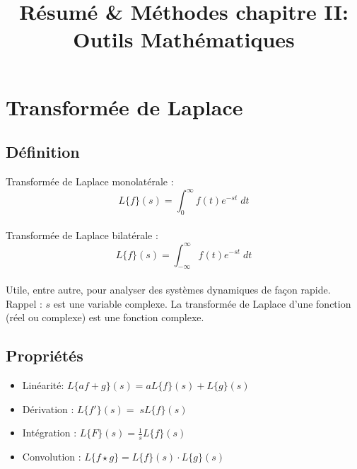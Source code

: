 \documentclass[11pt,a4paper]{article}
\begin{document}
\title{Résumé \& Méthodes chapitre II: Outils Mathématiques}
\maketitle
\section{Transformée de Laplace}
\subsection{Définition}
Transformée de Laplace monolatérale : 
	\[L\{f\}(s) = \displaystyle \int^{\infty}_{0} f(t) e^{-st} \; dt\]\\ 
	\vspace{0.3cm}
Transformée de Laplace bilatérale : \[L\{f\}(s) = \displaystyle \int^{\infty}_{-\infty} f(t) e^{-st} \; dt\]\\

Utile, entre autre, pour analyser des systèmes dynamiques de façon rapide. \\

Rappel :  $s$ est une variable complexe. La transformée de Laplace d'une fonction (réel ou complexe) est une fonction complexe.\\
\vspace{0.15cm}


\subsection{Propriétés}

\begin{itemize}
\item Linéarité:  $L\{af+g\}(s) = a L\{ f\}(s) + L \{ g \} (s)$
\vspace{0.1cm}
\item Dérivation : $ L\{f'\}(s) = \; s L\{f \}(s)$
\vspace{0.1cm}
\item Intégration : $ L\{F\}(s) = \frac{\displaystyle 1}{\displaystyle s} L\{f \}(s) $
\vspace{0.1cm}
\item Convolution : $ L\{f \star g \} = L\{f \}(s) \cdot L \{ g \} (s)  $
\end{itemize}

\vspace{0.15cm}
\end{document}
